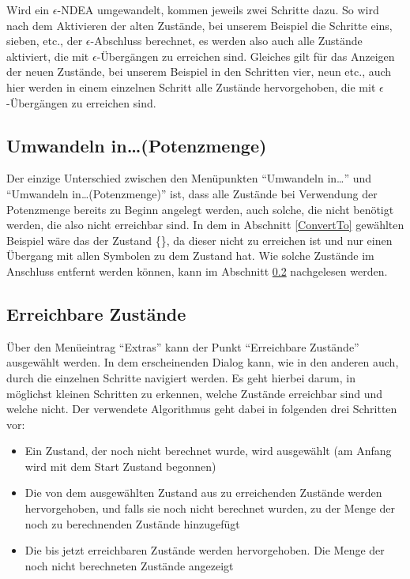 Wird ein $\epsilon$-NDEA umgewandelt, kommen jeweils zwei Schritte dazu. So wird
nach dem Aktivieren der alten Zustände, bei unserem Beispiel die Schritte eins,
sieben, etc., der $\epsilon$-Abschluss berechnet, es werden also auch alle
Zustände aktiviert, die mit $\epsilon$-Übergängen zu erreichen sind. Gleiches
gilt für das Anzeigen der neuen Zustände, bei unserem Beispiel in den Schritten
vier, neun etc., auch hier werden in einem einzelnen Schritt alle Zustände
hervorgehoben, die mit $\epsilon$-Übergängen zu erreichen sind.


\subsection{Umwandeln in\ldots (Potenzmenge)}
Der einzige Unterschied zwischen den Menüpunkten "`Umwandeln in\ldots"' und
"`Umwandeln in\ldots (Potenzmenge)"' ist, dass alle Zustände bei Verwendung der
Potenzmenge bereits zu Beginn angelegt werden, auch solche, die nicht benötigt
werden, die also nicht erreichbar sind. In dem in Abschnitt \ref{ConvertTo}
gewählten Beispiel wäre das der Zustand \{\}, da dieser nicht zu
erreichen ist und nur einen Übergang mit allen Symbolen zu dem Zustand
\State{$\emptyset$} hat. Wie solche Zustände im Anschluss entfernt werden können,
kann im Abschnitt \ref{ReachableStates} nachgelesen werden.


\subsection{Erreichbare Zustände}\label{ReachableStates}

Über den Menüeintrag "`Extras"' kann der Punkt "`Erreichbare Zustände"'
ausgewählt werden. In dem erscheinenden Dialog kann, wie in den anderen auch,
durch die einzelnen Schritte navigiert werden. Es geht hierbei darum, in
möglichst kleinen Schritten zu erkennen, welche Zustände erreichbar sind und
welche nicht. Der verwendete Algorithmus geht dabei in folgenden drei Schritten
vor:

\begin{itemize}
  \item Ein Zustand, der noch nicht berechnet wurde, wird ausgewählt (am Anfang
  wird mit dem Start Zustand begonnen)
  \item Die von dem ausgewählten Zustand aus zu erreichenden Zustände werden
  hervorgehoben, und falls sie noch nicht berechnet wurden, zu der Menge der
  noch zu berechnenden Zustände hinzugefügt
  \item Die bis jetzt erreichbaren Zustände werden hervorgehoben. Die Menge der
  noch nicht berechneten Zustände angezeigt 
\end{itemize}

